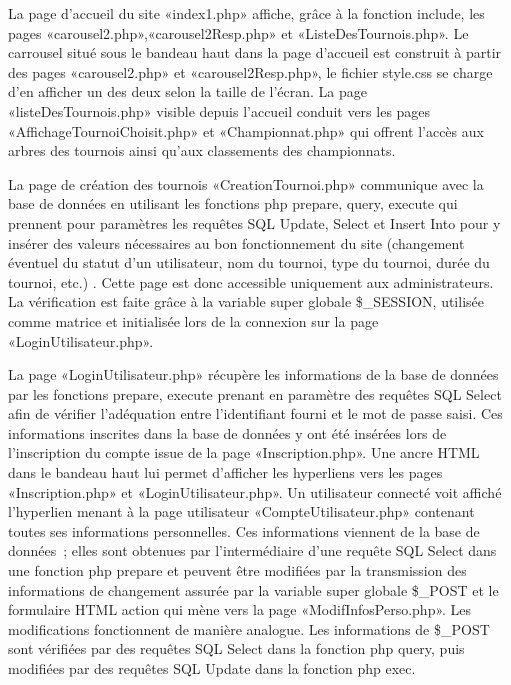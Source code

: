 \documentclass[12pt]{report}
\begin{document}
       \par
	   La page d’accueil du site «index1.php» affiche, grâce à la fonction include, les pages «carousel2.php»,«carousel2Resp.php» et «ListeDesTournois.php».
       Le carrousel situé sous le bandeau haut dans la page d’accueil est construit à partir des pages «carousel2.php» et «carousel2Resp.php», le fichier style.css se charge d’en afficher un des deux selon la taille de l’écran.
       La page «listeDesTournois.php» visible depuis l’accueil conduit vers les pages «AffichageTournoiChoisit.php» et «Championnat.php» qui offrent l’accès aux arbres des tournois ainsi qu’aux classements des championnats.
       \bigskip
       \par       
       La page de création des tournois «CreationTournoi.php» communique avec la base de données en utilisant les fonctions php prepare, query, execute qui prennent pour paramètres  les requêtes SQL Update, Select et Insert Into pour y insérer des valeurs nécessaires au bon fonctionnement du site (changement éventuel du statut d’un utilisateur, nom du tournoi, type du tournoi, durée du tournoi, etc.) . Cette page est donc accessible uniquement aux administrateurs. La vérification est faite grâce à la variable super globale \$\_SESSION, utilisée comme matrice et initialisée lors de la connexion sur la page «LoginUtilisateur.php».
       \bigskip
       \par
 	   La page «LoginUtilisateur.php» récupère les informations de la base de 
 	   données par les fonctions prepare, execute prenant en paramètre des 
 	   requêtes SQL Select afin de vérifier l’adéquation entre l’identifiant 
 	   fourni et le mot de passe saisi. Ces informations inscrites dans la base 
 	   de données  y ont été insérées lors de l’inscription du compte issue de 
 	   la page «Inscription.php». Une ancre HTML dans le bandeau haut lui 
 	   permet d’afficher les hyperliens vers les pages «Inscription.php» et 
 	   «LoginUtilisateur.php».
       Un utilisateur connecté voit affiché l’hyperlien menant à la page utilisateur  «CompteUtilisateur.php» contenant toutes ses informations personnelles. Ces informations viennent de la base de données ; elles sont obtenues par l’intermédiaire d’une requête SQL Select dans une fonction php prepare et peuvent être modifiées par la transmission des informations de changement assurée par la variable super globale \$\_POST et le formulaire HTML action qui mène vers la page «ModifInfosPerso.php». Les modifications fonctionnent de manière analogue. Les informations de \$\_POST sont vérifiées par des requêtes SQL Select dans la fonction php query, puis modifiées par des requêtes SQL Update dans la fonction php exec.
\end{document}
